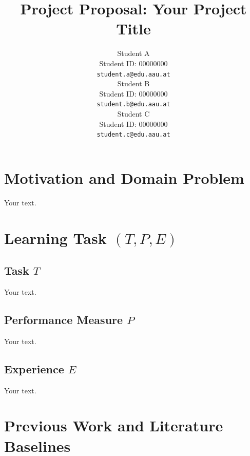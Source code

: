 \documentclass{article}
\title{Project Proposal: Your Project Title}
\author{%
  Student A \\
  Student ID: 00000000 \\
  \texttt{student.a@edu.aau.at} \\
  \And
  Student B \\
  Student ID: 00000000 \\
  \texttt{student.b@edu.aau.at} \\
  \And
  Student C \\
  Student ID: 00000000 \\
  \texttt{student.c@edu.aau.at} \\
}
\begin{document}
\maketitle

\section{Motivation and Domain Problem}

Your text.

\section{Learning Task $(T, P, E)$}

\subsection{Task $T$}

Your text.

\subsection{Performance Measure $P$}

Your text.

\subsection{Experience $E$}

Your text.

\section{Previous Work and Literature Baselines}
\end{document}
